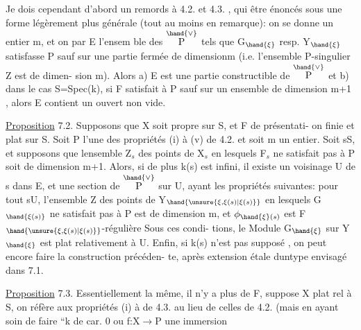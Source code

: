 
Je dois cependant d'abord  un remords à 4.2. et 4.3. , qui
 être énoncés sous une forme légèrement plus générale (tout au
moins en remarque): on se donne un entier m, et on  par E l'ensem
ble des \hand{$\xi\in$}$\overset{\hand{\vee}}{\text{P}}$ tels que G$_{\hand{\xi}}$ resp. Y$_{\hand{\xi}}$ satisfasse P sauf  sur une
partie fermée de dimension\hand{$\leq$}m (i.e. l'ensemble P-singulier Z est de dimen-%
sion\hand{$\leq$} m). Alors a) E est une partie constructible de $\overset{\hand{\vee}}{\text{P}}$ et b) dans le
cas S=Spec(k), si F  satisfait à P sauf  sur un ensemble de
dimension\hand{$\leq$} m+1 , alors E contient un ouvert non vide.

\uline{Proposition} 7.2. Supposons que X soit propre sur S, et F de présentati-%
on finie et plat sur S. Soit P l'une des propriétés (i) à (v) de 4.2.
et soit m un entier. Soit s\hand{$\in$}S, et supposons que 
 lensemble Z$_s$ des points de X$_s$ en lesquels F$_s$ ne satisfait
pas à P soit de dimension \hand{$\leq$} m+1. Alors, si de plus k(s) est infini, il
existe un voisinage U de s dans E, et une section \hand{$\xi$} de $\overset{\hand{\vee}}{\text{P}}$ sur U, ayant
les propriétés suivantes: pour tout s\hand{$\in$}U, l'ensemble Z des points
de  Y$_{\hand{\unsure{\xi,\xi(s)|\xi(s)}}}$ en lesquels G$_{\hand{\xi(s)}}$ ne satisfait pas à P est de dimension
\hand{$\leq$}m, et $\phi_{\hand{\xi}(s)}$ est F$_{\hand{\unsure{\xi,\xi(s)|\xi(s)}}}$-régulière\hand{,}  Sous ces condi-%
tions, le Module G$_{\hand{\xi}}$ sur Y$_{\hand{\xi}}$ est plat relativement à U. Enfin, si k(s)
n'est pas supposé , on peut encore faire la construction précéden-%
te, après extension étale duntype envisagé dans 7.1.

\uline{Proposition} 7.3. Essentiellement la même, il n'y a plus de F, 
suppose X plat rel à S, on réfère aux propriétés (i) à  de 4.3. au
lieu de celles de 4.2. (mais en ayant soin de faire  
``k de car. 0 ou f:X$\longrightarrow$P une immersion\hand{$\xi$}


